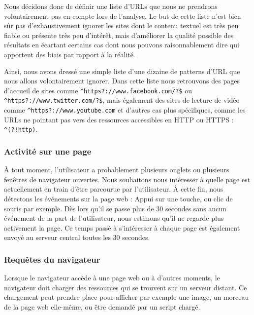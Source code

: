			Nous décidons donc de définir une liste d'URLs que nous ne prendrons volontairement pas en compte lors de l'analyse. Le but de cette liste n'est bien sûr pas d'exhaustivement ignorer les sites dont le contenu textuel est très peu fiable ou présente très peu d'intérêt, mais d'améliorer la qualité possible des résultats en écartant certains cas dont nous pouvons raisonnablement dire qui apportent des biais par rapport à la réalité.

			Ainsi, nous avons dressé une simple liste d'une dizaine de patterns d'URL que nous allons volontairement ignorer. Dans cette liste nous retrouvons des pages d'accueil de sites comme \texttt{\^{}https?://www.facebook.com/?\$} ou \linebreak
			\texttt{\^{}https?://www.twitter.com/?\$}, mais également des sites de lecture de vidéo comme \texttt{\^{}https?://www.youtube.com} et d'autres cas plus spécifiques, comme les URLs ne pointant pas vers des ressources accessibles en HTTP ou HTTPS : \texttt{\^{}(?!http)}.

		\subsubsection{Activité sur une page}

			À tout moment, l'utilisateur a probablement plusieurs onglets ou plusieurs fenêtres de navigateur ouvertes. Nous souhaitons nous intéresser à quelle page est actuellement en train d'être parcourue par l'utilisateur. À cette fin, nous détectons les événements sur la page web : Appui sur une touche, ou clic de souris par exemple. Dès lors qu'il se passe plus de 30 secondes sans aucun événement de la part de l'utilisateur, nous estimons qu'il ne regarde plus activement la page. Ce temps passé à s'intéresser à chaque page est également envoyé au serveur central toutes les 30 secondes.

		\subsubsection{Requêtes du navigateur}

			Lorsque le navigateur accède à une page web ou à d'autres moments, le navigateur doit charger des ressources qui se trouvent sur un serveur distant. Ce chargement peut prendre place pour afficher par exemple une image, un morceau de la page web elle-même, ou être demandé par un script chargé.

